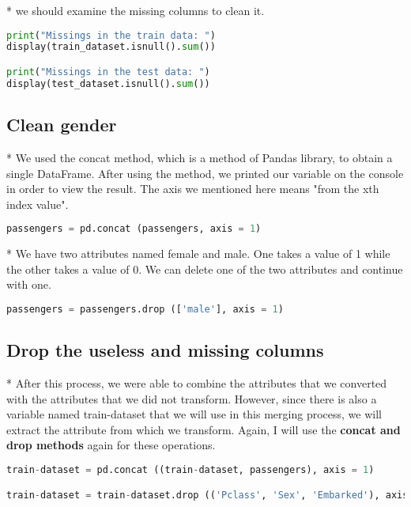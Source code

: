 \documentclass[onecolumn]{article}
\begin{document}
* we should examine the missing columns to clean it.

\begin{lstlisting}[language=Python, caption= missing columns] 
print("Missings in the train data: ")
display(train_dataset.isnull().sum())

print("Missings in the test data: ") 
display(test_dataset.isnull().sum())
\end{lstlisting}

\subsection{Clean gender}

* We used the concat method, which is a method of Pandas library, to obtain a single DataFrame. After using the method, we printed our variable on the console in order to view the result. The axis we mentioned here means "from the xth index value".

\begin{lstlisting}[language=Python, caption= concat passengers] 
passengers = pd.concat (passengers, axis = 1)
\end{lstlisting}


* We have two attributes named female and male. One takes a value of 1 while the other takes a value of 0. We can delete one of the two attributes and continue with one.

\begin{lstlisting}[language=Python, caption= drop male] 
passengers = passengers.drop (['male'], axis = 1)
\end{lstlisting}

\subsection{Drop the useless and missing columns}

* After this process, we were able to combine the attributes that we converted with the attributes that we did not transform. However, since there is also a variable named train-dataset that we will use in this merging process, we will extract the attribute from which we transform. Again, I will use the\textbf{ concat and drop methods} again for these operations.

\begin{lstlisting}[language=Python, caption= drop the useless and missing columns] 
train-dataset = pd.concat ((train-dataset, passengers), axis = 1)

train-dataset = train-dataset.drop (('Pclass', 'Sex', 'Embarked'), axis = 1)
\end{lstlisting}
\end{document}
